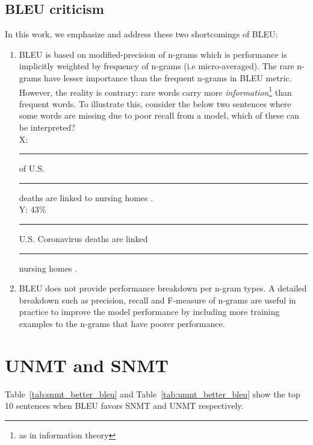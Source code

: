 \subsection{BLEU criticism}
In this work, we emphasize and address these two shortcomings of BLEU:
\begin{enumerate}
\item BLEU is based on modified-precision of n-grams which is performance is implicitly weighted by frequency of n-grams (i.e micro-averaged).
 The rare n-grams have lesser importance than the frequent n-grams in BLEU metric. 
 However, the reality is contrary: rare words carry more \textit{information}\footnote{as in information theory} than frequent words.
 To illustrate this, consider the below two sentences where some words are missing due to poor recall from a model, which of these can be interpreted?\\
X: \rule{5mm}{0.15mm} of U.S. \rule{5mm}{0.15mm} deaths are linked to nursing homes .\\
Y: 43\% \rule{5mm}{0.15mm} U.S. Coronavirus deaths are linked \rule{5mm}{0.15mm} nursing homes .\\

\item BLEU does not provide performance breakdown per n-gram types. A detailed breakdown such as precision, recall and F-measure of n-grams are useful in practice to improve the model performance by including more training examples to the n-grams that have poorer performance.
\end{enumerate}


\section{UNMT and SNMT}
Table~\ref{tab:snmt_better_bleu} and Table~\ref{tab:unmt_better_bleu} show the top 10 sentences when BLEU favors SNMT and UNMT respectively.


